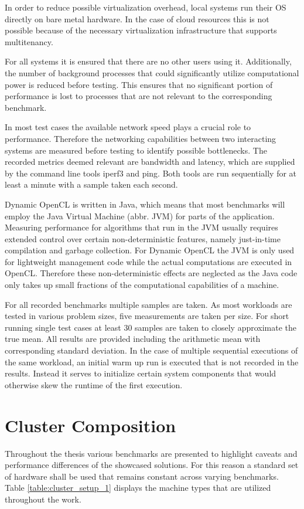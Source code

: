 In order to reduce possible virtualization overhead, local systems run their OS directly on bare metal hardware. In the case of cloud resources this is not possible because of the necessary virtualization infrastructure that supports multitenancy.

For all systems it is ensured that there are no other users using it. Additionally, the number of background processes that could significantly utilize computational power is reduced before testing. This ensures that no significant portion of performance is lost to processes that are not relevant to the corresponding benchmark.

In most test cases the available network speed plays a crucial role to performance. Therefore the networking capabilities between two interacting systems are measured before testing to identify possible bottlenecks. The recorded metrics deemed relevant are bandwidth and latency, which are supplied by the command line tools iperf3 and ping. Both tools are run sequentially for at least a minute with a sample taken each second.

Dynamic OpenCL is written in Java, which means that most benchmarks will employ the Java Virtual Machine (abbr. JVM) for parts of the application. Measuring performance for algorithms that run in the JVM usually requires extended control over certain non-deterministic features, namely just-in-time compilation and garbage collection\cite{rigorous_java}. For Dynamic OpenCL the JVM is only used for lightweight management code while the actual computations are executed in OpenCL. Therefore these non-deterministic effects are neglected as the Java code only takes up small fractions of the computational capabilities of a machine.

For all recorded benchmarks multiple samples are taken. As most workloads are tested in various problem sizes, five measurements are taken per size. For short running single test cases at least 30 samples are taken to closely approximate the true mean\cite{measuring_computer_performance}. All results are provided including the arithmetic mean with corresponding standard deviation. In the case of multiple sequential executions of the same workload, an initial warm up run is executed that is not recorded in the results. Instead it serves to initialize certain system components that would otherwise skew the runtime of the first execution.

\section{Cluster Composition}
\label{cluster_composition}
Throughout the thesis various benchmarks are presented to highlight caveats and performance differences of the showcased solutions. For this reason a standard set of hardware shall be used that remains constant across varying benchmarks. Table \ref{table:cluster_setup_1} displays the machine types that are utilized throughout the work.

